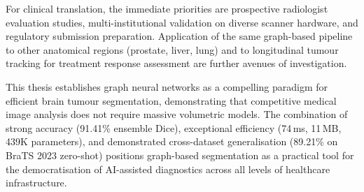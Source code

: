For clinical translation, the immediate priorities are prospective radiologist evaluation studies, multi-institutional validation on diverse scanner hardware, and regulatory submission preparation. Application of the same graph-based pipeline to other anatomical regions (prostate, liver, lung) and to longitudinal tumour tracking for treatment response assessment are further avenues of investigation.

This thesis establishes graph neural networks as a compelling paradigm for efficient brain tumour segmentation, demonstrating that competitive medical image analysis does not require massive volumetric models. The combination of strong accuracy (91.41\% ensemble Dice), exceptional efficiency (74\,ms, 11\,MB, 439K parameters), and demonstrated cross-dataset generalisation (89.21\% on BraTS 2023 zero-shot) positions graph-based segmentation as a practical tool for the democratisation of AI-assisted diagnostics across all levels of healthcare infrastructure.
